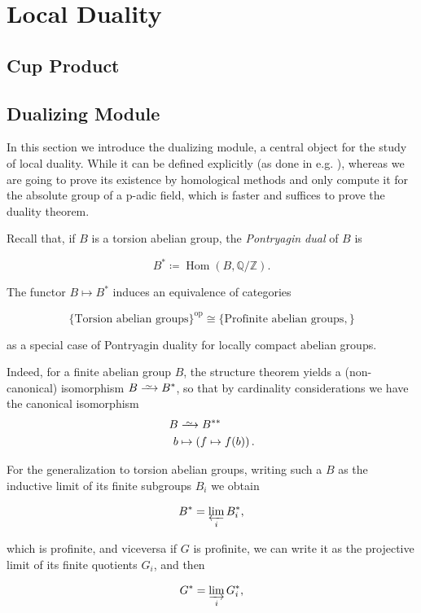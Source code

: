 \documentclass[a4paper]{article}
\def\Q{\mathbb{Q}}
\def\Z{\mathbb{Z}}
\DeclareMathOperator{\Hom}{Hom}
\newcommand\Iso{\xrightarrow{
   \,\smash{\raisebox{-0.65ex}{\ensuremath{\scriptstyle\sim}}}\,}}
\theoremstyle{definition}
\theoremstyle{definition}
\theoremstyle{remark}
\begin{document}
\section{Local Duality}

\subsection{Cup Product}

\subsection{Dualizing Module}

In this section we introduce the dualizing module, a central object for the study of local duality. While it can be defined explicitly (as done in e.g. \cite{Neukirch}),
whereas we are going to prove its existence by homological methods and only compute it for the absolute group of a p-adic field, which is faster and suffices to prove the duality theorem.

Recall that, if \(B\) is a torsion abelian group, the \textit{Pontryagin dual} of \(B\) is

\[
    B^*\coloneqq \Hom(B,\Q/\Z).
\]

The functor \(B\mapsto B^*\)  induces an equivalence of categories

\[
    \{ \text{Torsion abelian groups} \}^{\text{op}}  \cong \{ \text{Profinite abelian groups}, \}
\]

as a special case of Pontryagin duality for locally compact abelian groups.

Indeed, for a finite abelian group \(B\), the structure theorem yields a (non-canonical) isomorphism \(B\Iso B^*\), so that by cardinality considerations we have the canonical isomorphism
\begin{align*}
    B & \Iso B^{**}                           \\
    b & \mapsto \left( f\mapsto f(b) \right).
\end{align*}

For the generalization to torsion abelian groups, writing such a \(B\) as the inductive limit of its finite subgroups \(B_i\) we obtain

\[
    B^* = \varprojlim_i B_i^*,
\]

which is profinite, and viceversa if \(G\) is profinite, we can write it as the projective limit of its finite quotients \(G_i\), and then

\[
    G^* = \varinjlim_i G_i^*,
\]
\end{document}
